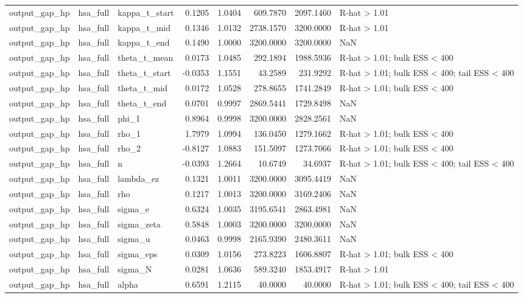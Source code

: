 \begin{tabular}{lllrrrrl}
output\_gap\_hp & hsa\_full & kappa\_t\_start & 0.1205 & 1.0404 & 609.7870 & 2097.1460 & R-hat > 1.01 \\
output\_gap\_hp & hsa\_full & kappa\_t\_mid & 0.1346 & 1.0132 & 2738.1570 & 3200.0000 & R-hat > 1.01 \\
output\_gap\_hp & hsa\_full & kappa\_t\_end & 0.1490 & 1.0000 & 3200.0000 & 3200.0000 & NaN \\
output\_gap\_hp & hsa\_full & theta\_t\_mean & 0.0173 & 1.0485 & 292.1894 & 1988.5936 & R-hat > 1.01; bulk ESS < 400 \\
output\_gap\_hp & hsa\_full & theta\_t\_start & -0.0353 & 1.1551 & 43.2589 & 231.9292 & R-hat > 1.01; bulk ESS < 400; tail ESS < 400 \\
output\_gap\_hp & hsa\_full & theta\_t\_mid & 0.0172 & 1.0528 & 278.8655 & 1741.2849 & R-hat > 1.01; bulk ESS < 400 \\
output\_gap\_hp & hsa\_full & theta\_t\_end & 0.0701 & 0.9997 & 2869.5441 & 1729.8498 & NaN \\
output\_gap\_hp & hsa\_full & phi\_1 & 0.8964 & 0.9998 & 3200.0000 & 2828.2561 & NaN \\
output\_gap\_hp & hsa\_full & rho\_1 & 1.7979 & 1.0994 & 136.0450 & 1279.1662 & R-hat > 1.01; bulk ESS < 400 \\
output\_gap\_hp & hsa\_full & rho\_2 & -0.8127 & 1.0883 & 151.5097 & 1273.7066 & R-hat > 1.01; bulk ESS < 400 \\
output\_gap\_hp & hsa\_full & n & -0.0393 & 1.2664 & 10.6749 & 34.6937 & R-hat > 1.01; bulk ESS < 400; tail ESS < 400 \\
output\_gap\_hp & hsa\_full & lambda\_ez & 0.1321 & 1.0011 & 3200.0000 & 3095.4419 & NaN \\
output\_gap\_hp & hsa\_full & rho & 0.1217 & 1.0013 & 3200.0000 & 3169.2406 & NaN \\
output\_gap\_hp & hsa\_full & sigma\_e & 0.6324 & 1.0035 & 3195.6541 & 2863.4981 & NaN \\
output\_gap\_hp & hsa\_full & sigma\_zeta & 0.5848 & 1.0003 & 3200.0000 & 3200.0000 & NaN \\
output\_gap\_hp & hsa\_full & sigma\_u & 0.0463 & 0.9998 & 2165.9390 & 2480.3611 & NaN \\
output\_gap\_hp & hsa\_full & sigma\_eps & 0.0309 & 1.0156 & 273.8223 & 1606.8807 & R-hat > 1.01; bulk ESS < 400 \\
output\_gap\_hp & hsa\_full & sigma\_N & 0.0281 & 1.0636 & 589.3240 & 1853.4917 & R-hat > 1.01 \\
output\_gap\_hp & hsa\_full & alpha & 0.6591 & 1.2115 & 40.0000 & 40.0000 & R-hat > 1.01; bulk ESS < 400; tail ESS < 400 \\

\end{tabular}
